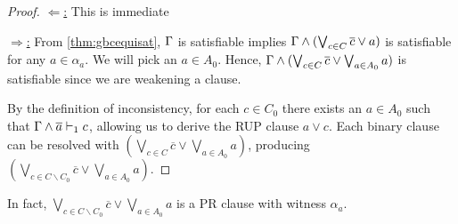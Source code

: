 \begin{proof}
    \underline{$\Leftarrow$:} This is immediate


    \underline{$\Rightarrow$:} From \autoref{thm:gbcequisat}, $\Gamma$ is
    satisfiable implies $\Gamma \land (\bigvee_{c \in C} \overline{c} \lor a)$
    is satisfiable for any $a \in \alpha_a$. We will pick an $a \in A_0$. Hence,
    $\Gamma \land (\bigvee_{c \in C} \overline{c} \lor \bigvee_{a \in A_0} a)$
    is satisfiable since we are weakening a clause.


    
    By the definition of inconsistency, for each $c \in C_0$ there exists an $a
    \in A_0$ such that $\Gamma \land \overline{a} \vdash_1 c$, allowing us to derive
    the RUP clause  $a \lor c$. Each binary clause can be resolved with $
    (\bigvee_{c \in C} \overline{c} \lor \bigvee_{a \in A_0} a)$, producing
    $(\bigvee_{c \in C \backslash C_0} \overline{c} \lor \bigvee_{a \in A_0}
    a)$. 
    

%
%
\end{proof}

In fact, $\bigvee_{c \in C \backslash C_0} \overline{c} \lor \bigvee_{a \in A_0}
a$ is a PR clause with witness $\alpha_a$. 


